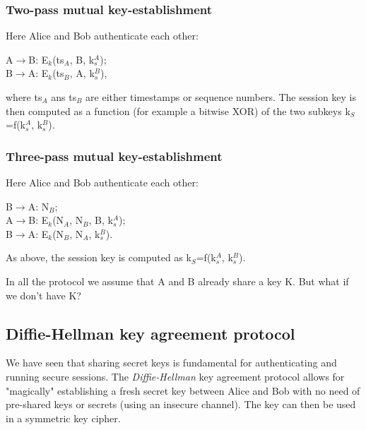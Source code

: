 \documentclass[a4paper, 12pt]{report}
\begin{document}
\subsubsection{Two-pass mutual key-establishment}
Here Alice and Bob authenticate each other:
\begin{center}
	A$\rightarrow$B: E$_k$(ts$_A$, B, k$^A_s$);\\
	B$\rightarrow$A: E$_k$(ts$_B$, A, k$^B_s$),\\
\end{center}
where ts$_A$ ans ts$_B$ are either timestamps or sequence numbers. The session key is then computed as a function (for example a bitwise XOR) of the two subkeys k$_S$=f(k$^A_s$, k$^B_s$).

\subsubsection{Three-pass mutual key-establishment}
Here Alice and Bob authenticate each other:
\begin{center}
	B$\rightarrow$A: N$_B$;\\
	A$\rightarrow$B: E$_k$(N$_A$, N$_B$, B, k$^A_s$);\\
	B$\rightarrow$A: E$_k$(N$_B$, N$_A$, k$^B_s$).
\end{center}
As above, the session key is computed as k$_S$=f(k$^A_s$, k$^B_s$).

In all the protocol we assume that A and B already share a key K. But what if we don't have K?

\subsection*{Diffie-Hellman key agreement protocol}
We have seen that sharing secret keys is fundamental for authenticating and running secure sessions. The \textit{Diffie-Hellman} key agreement protocol allows for "magically" establishing a fresh secret key between Alice and Bob with no need of pre-shared keys or secrets (using an insecure channel). The key can then be used in a symmetric key cipher.
\end{document}

